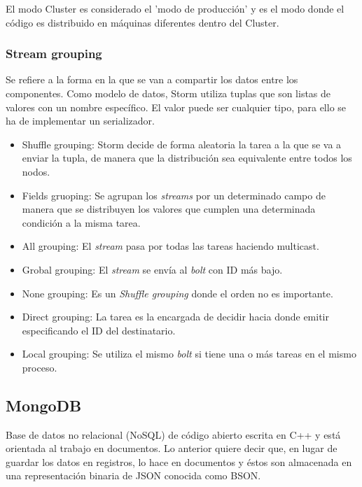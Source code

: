	El modo Cluster es considerado el 'modo de producción' y es el modo donde el código es distribuido en máquinas diferentes dentro del Cluster.\\

	\subsubsection{Stream grouping}

	Se refiere a la forma en la que se van a compartir los datos entre los componentes. Como modelo de datos, Storm utiliza tuplas que son listas de valores con un nombre específico. El valor puede ser cualquier tipo, para ello se ha de implementar un serializador.\\

	\begin{itemize}
	\item Shuffle grouping: Storm decide de forma aleatoria la tarea a la que se va a enviar la tupla, de manera que la distribución sea equivalente entre todos los nodos.
	\item Fields gruoping: Se agrupan los \textit{streams} por un determinado campo de manera que se distribuyen los valores que cumplen una determinada condición a la misma tarea.
	\item All grouping: El \textit{stream} pasa por todas las tareas haciendo multicast.
	\item Grobal grouping: El \textit{stream} se envía al \textit{bolt} con ID más bajo.
	\item None grouping: Es un \textit{Shuffle grouping} donde el orden no es importante.
	\item Direct grouping: La tarea es la encargada de decidir hacia donde emitir especificando el ID del destinatario.
	\item Local grouping: Se utiliza el mismo \textit{bolt} si tiene una o más tareas en el mismo proceso.
	\end{itemize}

	\subsection{MongoDB}

	Base de datos no relacional (NoSQL) de código abierto escrita en C++ y está orientada al trabajo en documentos. Lo anterior quiere decir que, en lugar de guardar los datos en registros, lo hace en documentos y éstos son almacenada en una representación binaria de JSON conocida como BSON.\\

